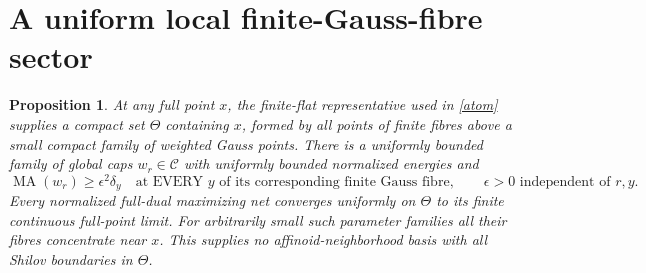 \documentclass[11pt]{article}
\newtheorem{proposition}[theorem]{Proposition}
\newcommand{\MA}{\operatorname{MA}}
\newcommand{\C}{\mathcal C}
\begin{document}
\section{A uniform local finite-Gauss-fibre sector}
\begin{proposition}\label{uniformfibres}
At any full point $x$, the finite-flat representative used in
\eqref{atom} supplies a compact set $\Theta$ containing $x$, formed
by all points of finite fibres above a small compact family of
weighted Gauss points. There is a uniformly bounded family of global
caps $w_r\in\C$ with uniformly bounded normalized energies and
\[
 \MA(w_r)\ge\epsilon^2\delta_y
 \quad\text{at EVERY }y\text{ of its corresponding finite Gauss fibre},
 \qquad\epsilon>0\text{ independent of }r,y.
\]
Every normalized full-dual maximizing net converges uniformly on
$\Theta$ to its finite continuous full-point limit. For arbitrarily
small such parameter families all their fibres concentrate near $x$.
This supplies no affinoid-neighborhood basis with all Shilov boundaries
in $\Theta$.
\end{proposition}
\end{document}
